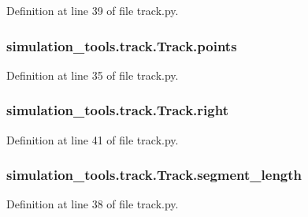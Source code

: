 Definition at line 39 of file track.\+py.

\subsubsection[{\texorpdfstring{points}{points}}]{\setlength{\rightskip}{0pt plus 5cm}simulation\+\_\+tools.\+track.\+Track.\+points}\hypertarget{classsimulation__tools_1_1track_1_1_track_ac6de34747fd382897e7f790cd9faf67c}{}\label{classsimulation__tools_1_1track_1_1_track_ac6de34747fd382897e7f790cd9faf67c}


Definition at line 35 of file track.\+py.

\subsubsection[{\texorpdfstring{right}{right}}]{\setlength{\rightskip}{0pt plus 5cm}simulation\+\_\+tools.\+track.\+Track.\+right}\hypertarget{classsimulation__tools_1_1track_1_1_track_a668e3804fa2720790fb57f592c73c782}{}\label{classsimulation__tools_1_1track_1_1_track_a668e3804fa2720790fb57f592c73c782}


Definition at line 41 of file track.\+py.

\subsubsection[{\texorpdfstring{segment\+\_\+length}{segment_length}}]{\setlength{\rightskip}{0pt plus 5cm}simulation\+\_\+tools.\+track.\+Track.\+segment\+\_\+length}\hypertarget{classsimulation__tools_1_1track_1_1_track_aa74dadec286ae8ad2f3399c6fd9e9fd9}{}\label{classsimulation__tools_1_1track_1_1_track_aa74dadec286ae8ad2f3399c6fd9e9fd9}


Definition at line 38 of file track.\+py.

